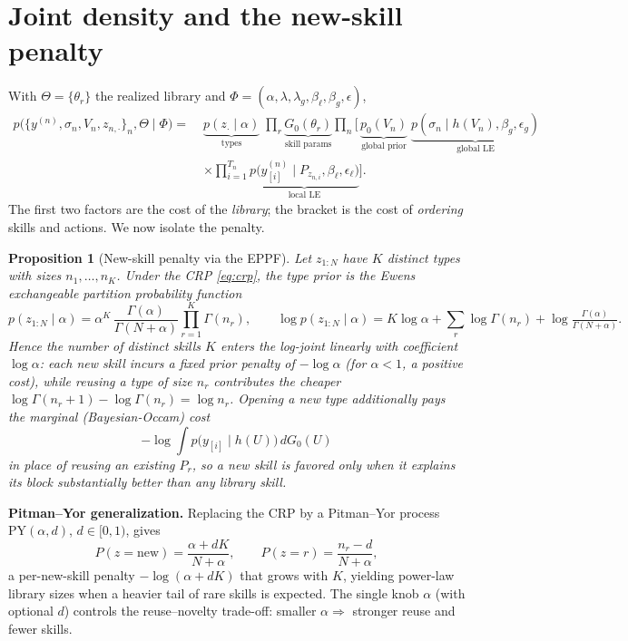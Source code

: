 \documentclass[11pt]{article}
\newtheorem{proposition}{Proposition}
\begin{document}
\section{Joint density and the new-skill penalty}
With $\Theta=\{\theta_r\}$ the realized library and $\Phi=(\alpha,\lambda,\lambda_g,\beta_\ell,\beta_g,\epsilon)$,
\begin{align}
p\big(\{y^{(n)},\sigma_n,V_n,z_{n,\cdot}\}_n,\Theta\mid\Phi\big)
=\;&\underbrace{p(z_{\cdot}\mid\alpha)}_{\text{types}}\;
\prod_{r}\underbrace{G_0(\theta_r)}_{\text{skill params}}
\prod_{n}\Big[\,\underbrace{p_0(V_n)}_{\text{global prior}}\;
\underbrace{p(\sigma_n\mid h(V_n),\beta_g,\epsilon_g)}_{\text{global LE}}\nonumber\\
&\times\prod_{i=1}^{T_n}\underbrace{p\big(y^{(n)}_{[i]}\mid P_{z_{n,i}},\beta_\ell,\epsilon_\ell\big)}_{\text{local LE}}\Big].
\label{eq:joint}
\end{align}
The first two factors are the cost of the \emph{library}; the bracket is the cost of \emph{ordering}
skills and actions. We now isolate the penalty.

\begin{proposition}[New-skill penalty via the EPPF]
\label{prop:penalty}
Let $z_{1:N}$ have $K$ distinct types with sizes $n_1,\dots,n_K$. Under the CRP \eqref{eq:crp}, the type
prior is the Ewens exchangeable partition probability function
\begin{equation}
p(z_{1:N}\mid\alpha)=\alpha^{K}\,\frac{\Gamma(\alpha)}{\Gamma(N+\alpha)}\prod_{r=1}^{K}\Gamma(n_r),
\qquad
\log p(z_{1:N}\mid\alpha)= K\log\alpha+\sum_{r}\log\Gamma(n_r)+\log\tfrac{\Gamma(\alpha)}{\Gamma(N+\alpha)} .
\label{eq:eppf}
\end{equation}
Hence the number of distinct skills $K$ enters the log-joint linearly with coefficient $\log\alpha$:
\emph{each new skill incurs a fixed prior penalty of $-\log\alpha$} (for $\alpha<1$, a positive cost),
while reusing a type of size $n_r$ contributes the cheaper $\log\Gamma(n_r{+}1)-\log\Gamma(n_r)=\log n_r$.
Opening a new type additionally pays the marginal (Bayesian-Occam) cost
\begin{equation}
-\log\!\int p\big(y_{[i]}\mid h(U)\big)\,dG_0(U)
\label{eq:occam}
\end{equation}
in place of reusing an existing $P_r$, so a new skill is favored only when it explains its block
substantially better than any library skill.
\end{proposition}

\noindent
\textbf{Pitman--Yor generalization.} Replacing the CRP by a Pitman--Yor process $\mathrm{PY}(\alpha,d)$,
$d\in[0,1)$, gives
\begin{equation}
P(z=\text{new})=\frac{\alpha+dK}{N+\alpha},\qquad P(z=r)=\frac{n_r-d}{N+\alpha},
\label{eq:py}
\end{equation}
a per-new-skill penalty $-\log(\alpha+dK)$ that grows with $K$, yielding power-law library sizes when a
heavier tail of rare skills is expected. The single knob $\alpha$ (with optional $d$) controls the
reuse--novelty trade-off: smaller $\alpha\Rightarrow$ stronger reuse and fewer skills.
\end{document}

